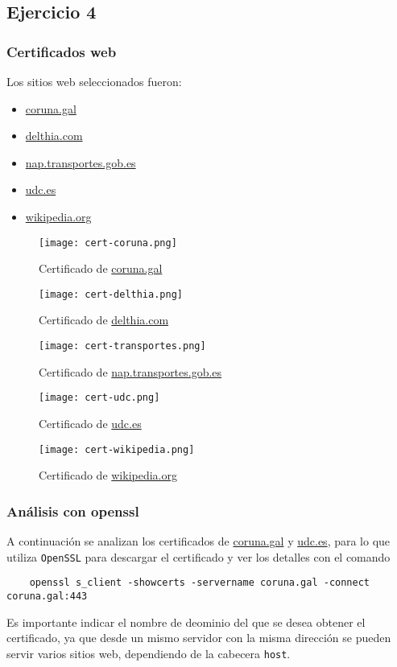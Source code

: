 \subsection{Ejercicio 4}
\graphicspath{ {img/4} }

\subsubsection{Certificados web}

Los sitios web seleccionados fueron:
\begin{itemize}
    \item \href{https://www.coruna.gal}{coruna.gal}
    \item \href{https://delthia.com}{delthia.com}
    \item \href{https://nap.transportes.gob.es}{nap.transportes.gob.es}
    \item \href{https://www.udc.es}{udc.es}
    \item \href{www.wikipedia.org}{wikipedia.org}
\end{itemize}

\begin{figure}[h]
    \texttt{[image: cert-coruna.png]}
    \caption{Certificado de \url{coruna.gal}}
\end{figure}

\begin{figure}[h]
    \texttt{[image: cert-delthia.png]}
    \caption{Certificado de \url{delthia.com}}
\end{figure}

\begin{figure}[h]
    \texttt{[image: cert-transportes.png]}
    \caption{Certificado de \url{nap.transportes.gob.es}}
\end{figure}

\begin{figure}[h]
    \texttt{[image: cert-udc.png]}
    \caption{Certificado de \url{udc.es}}
\end{figure}

\begin{figure}[h]
    \texttt{[image: cert-wikipedia.png]}
    \caption{Certificado de \url{wikipedia.org}}
\end{figure}

\subsubsection{Análisis con openssl}

A continuación se analizan los certificados de \url{coruna.gal} y \url{udc.es}, para lo que utiliza \texttt{OpenSSL} para descargar el certificado y ver los detalles con el comando

\begin{lstlisting}
    openssl s_client -showcerts -servername coruna.gal -connect coruna.gal:443
\end{lstlisting}

Es importante indicar el nombre de deominio del que se desea obtener el certificado, ya que desde un mismo servidor con la misma dirección se pueden servir varios sitios web, dependiendo de la cabecera \texttt{host}.
